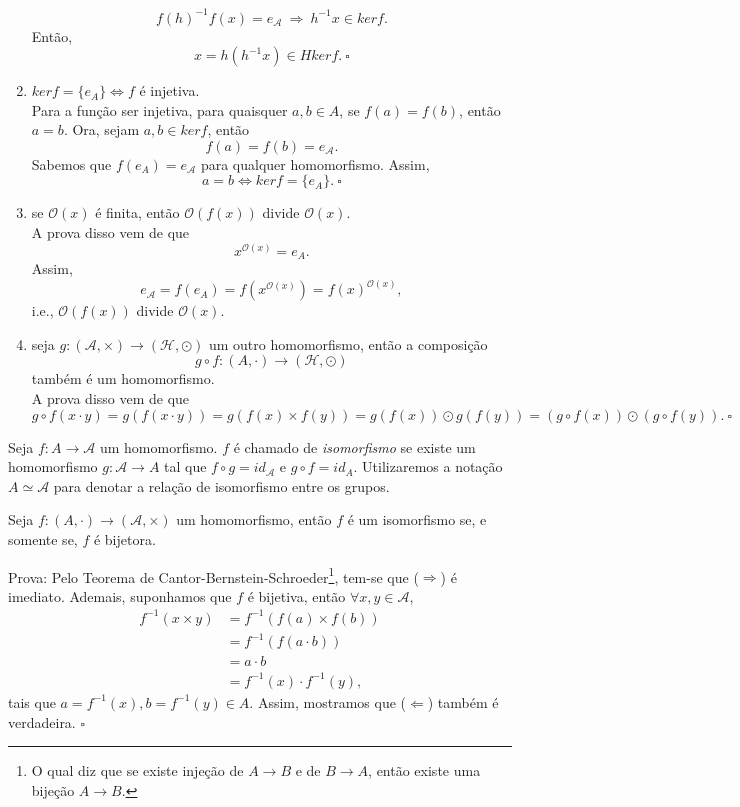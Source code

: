 \documentclass[11pt,openany]{book}
\begin{document}
\begin{enumerate}
    \[f(h)^{-1}f(x) = e_\mathcal{A} \ \Rightarrow \ h^{-1}x \in ker f.\]
    Então,
    \[x = h(h^{-1}x) \in Hker f. \ \square\]
    \item $ker f = \{e_A\} \Leftrightarrow f$ é injetiva.\\
    Para a função ser injetiva, para quaisquer $a,b \in A$, se $f(a) = f(b)$, então $a = b$. Ora, sejam $a,b \in ker f$, então
    \[f(a) = f(b) = e_\mathcal{A}.\]
    Sabemos que $f(e_A) = e_\mathcal{A}$ para qualquer homomorfismo. Assim,
    \[a = b \Leftrightarrow ker f = \{e_A\}. \ \square\]
    \item se $\mathcal{O}(x)$ é finita, então $\mathcal{O}(f(x))$ divide $\mathcal{O}(x)$.\\
    A prova disso vem de que
    \[x^{\mathcal{O}(x)} = e_A.\]
    Assim,
    \[e_{\mathcal{A}} = f(e_A) = f(x^{\mathcal{O}(x)}) = f(x)^{\mathcal{O}(x)},\]
    i.e., $\mathcal{O}(f(x))$ divide $\mathcal{O}(x)$.
    \item seja $g:(\mathcal{A}, \times)\rightarrow (\mathcal{H}, \odot)$ um outro homomorfismo, então a composição
    \[g \circ f:(A,\cdot)\rightarrow (\mathcal{H},\odot)\]
    também é um homomorfismo.\\
    A prova disso vem de que
    \[g \circ f(x\cdot y) = g(f(x\cdot y)) = g(f(x) \times f(y)) =  g(f(x)) \odot g(f(y)) = (g\circ f(x)) \odot (g\circ f(y)). \ \square\]
\end{enumerate}

\begin{definition}
\label{def:isomorfismo}
    Seja $f:A \rightarrow \mathcal{A}$ um homomorfismo. $f$ é chamado de \textit{isomorfismo} se existe um homomorfismo $g:\mathcal{A} \rightarrow A$ tal que $f \circ g = id_\mathcal{A}$ e $g \circ f = id_A$. Utilizaremos a notação $A \simeq \mathcal{A}$ para denotar a relação de isomorfismo entre os grupos.
\end{definition}

\begin{proposition}
\label{prop:isomorfismo_bijetividade}
    Seja $f:(A, \cdot)\rightarrow (\mathcal{A}, \times)$ um homomorfismo, então $f$ é um isomorfismo se, e somente se, $f$ é bijetora.

    \noindent Prova:
        Pelo Teorema de Cantor-Bernstein-Schroeder\footnote{O qual diz que se existe injeção de $A\rightarrow B$ e de $B\rightarrow A$, então existe uma bijeção $A\rightarrow B$.}, tem-se que ($\Rightarrow$) é imediato. Ademais, suponhamos que $f$ é bijetiva, então $\forall x,y \in \mathcal{A}$,
        \begin{align*}
            f^{-1}(x \times y) &= f^{-1}(f(a)\times f(b))\\
            &= f^{-1}(f(a\cdot b))\\
            &= a\cdot b\\
            &= f^{-1}(x) \cdot f^{-1}(y),
        \end{align*}
        tais que $a = f^{-1}(x), b= f^{-1}(y) \in A$. Assim, mostramos que ($\Leftarrow$) também é verdadeira. $\square$
\end{proposition}
\end{document}
